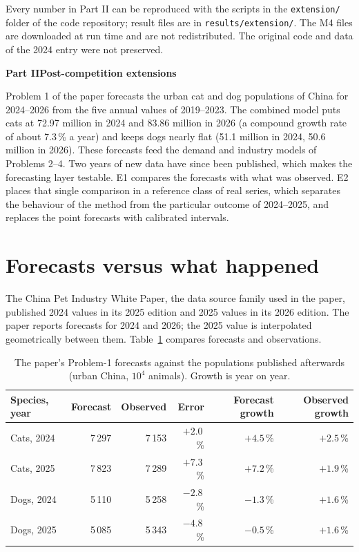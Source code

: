 Every number in Part II can be reproduced with the scripts in the \texttt{extension/} folder of the code repository; result files are in \texttt{results/extension/}. The M4 files are downloaded at run time and are not redistributed. The original code and data of the 2024 entry were not preserved.

\clearpage
{}

\setcounter{page}{1}
\begin{center}{\Large\bfseries Part II\quad Post-competition extensions}\end{center}

Problem 1 of the paper forecasts the urban cat and dog populations of China for 2024--2026 from the five annual values of 2019--2023. The combined model puts cats at 72.97 million in 2024 and 83.86 million in 2026 (a compound growth rate of about 7.3\,\% a year) and keeps dogs nearly flat (51.1 million in 2024, 50.6 million in 2026). These forecasts feed the demand and industry models of Problems 2--4. Two years of new data have since been published, which makes the forecasting layer testable. E1 compares the forecasts with what was observed. E2 places that single comparison in a reference class of real series, which separates the behaviour of the method from the particular outcome of 2024--2025, and replaces the point forecasts with calibrated intervals.

\section{Forecasts versus what happened}

The China Pet Industry White Paper, the data source family used in the paper, published 2024 values in its 2025 edition and 2025 values in its 2026 edition\cite{petdata}. The paper reports forecasts for 2024 and 2026; the 2025 value is interpolated geometrically between them. Table~\ref{tab:pet-e1} compares forecasts and observations.

\begin{table}[htbp]\centering\small
\caption{The paper's Problem-1 forecasts against the populations published afterwards (urban China, $10^4$ animals). Growth is year on year.}\label{tab:pet-e1}
\begin{tabular}{lrrrrr}\toprule
Species, year & Forecast & Observed & Error & Forecast growth & Observed growth\\\midrule
Cats, 2024 & 7\,297 & 7\,153 & $+2.0$\,\% & $+4.5$\,\% & $+2.5$\,\%\\
Cats, 2025 & 7\,823 & 7\,289 & $+7.3$\,\% & $+7.2$\,\% & $+1.9$\,\%\\
Dogs, 2024 & 5\,110 & 5\,258 & $-2.8$\,\% & $-1.3$\,\% & $+1.6$\,\%\\
Dogs, 2025 & 5\,085 & 5\,343 & $-4.8$\,\% & $-0.5$\,\% & $+1.6$\,\%\\\bottomrule
\end{tabular}
\end{table}

